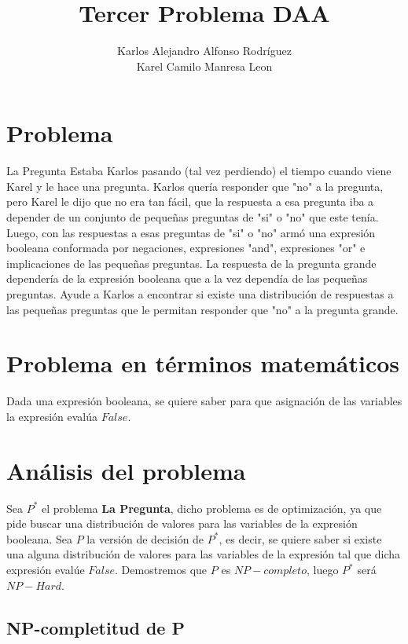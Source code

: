 \documentclass{article}
\begin{document}
\title{Tercer Problema DAA}
\author{Karlos Alejandro Alfonso Rodríguez \\ Karel Camilo Manresa Leon}
\maketitle
\newpage

\section*{Problema}
    
    La Pregunta
    Estaba Karlos pasando (tal vez perdiendo) el tiempo cuando viene Karel y le
    hace una pregunta. Karlos quería responder que "no" a la pregunta, pero
    Karel le dijo que no era tan fácil, que la respuesta a esa pregunta iba a
    depender de un conjunto de pequeñas preguntas de "si" o "no" que este
    tenía. Luego, con las respuestas a esas preguntas de "si" o "no" armó una
    expresión booleana conformada por negaciones, expresiones "and",
    expresiones "or" e implicaciones de las pequeñas preguntas. La respuesta
    de la pregunta grande dependería de la expresión booleana que a la vez
    dependía de las pequeñas preguntas. Ayude a Karlos a encontrar si existe
    una distribución de respuestas a las pequeñas preguntas que le permitan
    responder que "no" a la pregunta grande.

\section*{Problema en términos matemáticos}

    Dada una expresión booleana, se quiere saber para que asignación de las variables
    la expresión evalúa $False$. 

\section*{Análisis del problema}

    Sea $P^*$ el problema \textbf{La Pregunta}, dicho problema es de optimización, ya que pide buscar 
    una distribución de valores para las variables de la expresión booleana. Sea $P$ la versión de decisión
    de $P^*$, es decir, se quiere saber si existe una alguna distribución de valores para las variables de la expresión
    tal que dicha expresión evalúe $False$. Demostremos que $P$ es $NP-completo$, luego $P^*$ será $NP-Hard$.

    \subsection*{NP-completitud de P}
\end{document}
